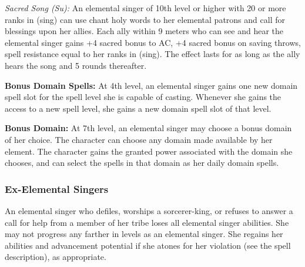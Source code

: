 {\textit{Sacred Song (Su):} An elemental singer of 10th level or higher with 20 or more ranks in  (sing) can use chant holy words to her elemental patrons and call for blessings upon her allies. Each ally within 9 meters who can see and hear the elemental singer gains +4 sacred bonus to AC, +4 sacred bonus on saving throws, spell resistance equal to her ranks in  (sing). The effect lasts for as long as the ally hears the song and 5 rounds thereafter.

\textbf{Bonus Domain Spells:} At 4th level, an elemental singer gains one new domain spell slot for the spell level she is capable of casting. Whenever she gains the access to a new spell level, she gains a new domain spell slot of that level.

\textbf{Bonus Domain:} At 7th level, an elemental singer may choose a bonus domain of her choice. The character can choose any domain made available by her element. The character gains the granted power associated with the domain she chooses, and can select the spells in that domain as her daily domain spells.

\subsubsection{Ex-Elemental Singers}
An elemental singer who defiles, worships a sorcerer-king, or refuses to answer a call for help from a member of her tribe loses all elemental singer abilities. She may not progress any farther in levels as an elemental singer. She regains her abilities and advancement potential if she atones for her violation (see the  spell description), as appropriate.
}